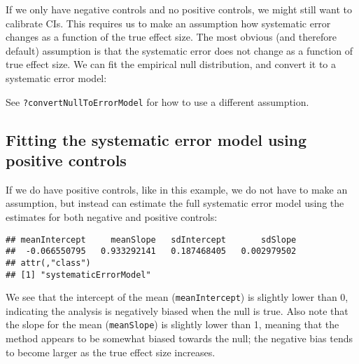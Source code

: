 \documentclass[
]{article}
\newenvironment{Shaded}{\begin{snugshade}}{\end{snugshade}}
\newcommand{\KeywordTok}[1]{\textcolor[rgb]{0.13,0.29,0.53}{\textbf{#1}}}
\newcommand{\NormalTok}[1]{#1}
\newcommand{\OperatorTok}[1]{\textcolor[rgb]{0.81,0.36,0.00}{\textbf{#1}}}
\newcommand{\StringTok}[1]{\textcolor[rgb]{0.31,0.60,0.02}{#1}}
\begin{document}
If we only have negative controls and no positive controls, we might
still want to calibrate CIs. This requires us to make an assumption how
systematic error changes as a function of the true effect size. The most
obvious (and therefore default) assumption is that the systematic error
does not change as a function of true effect size. We can fit the
empirical null distribution, and convert it to a systematic error model:

\begin{Shaded}
\end{Shaded}

See \texttt{?convertNullToErrorModel} for how to use a different
assumption.

\hypertarget{fitting-the-systematic-error-model-using-positive-controls}{%
\subsection{Fitting the systematic error model using positive
controls}\label{fitting-the-systematic-error-model-using-positive-controls}}

If we do have positive controls, like in this example, we do not have to
make an assumption, but instead can estimate the full systematic error
model using the estimates for both negative and positive controls:

\begin{Shaded}
\end{Shaded}

\begin{verbatim}
## meanIntercept     meanSlope   sdIntercept       sdSlope 
##  -0.066550795   0.933292141   0.187468405   0.002979502 
## attr(,"class")
## [1] "systematicErrorModel"
\end{verbatim}

We see that the intercept of the mean (\texttt{meanIntercept}) is
slightly lower than 0, indicating the analysis is negatively biased when
the null is true. Also note that the slope for the mean
(\texttt{meanSlope}) is slightly lower than 1, meaning that the method
appears to be somewhat biased towards the null; the negative bias tends
to become larger as the true effect size increases.
\end{document}
